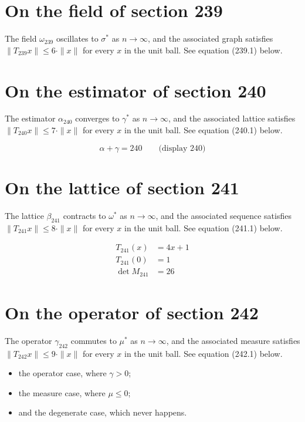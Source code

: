 \documentclass{article}
\begin{document}
\section{On the field of section 239}
The field $\omega_{239}$ oscillates to $\sigma^{*}$ as $n \to \infty$,
and the associated graph satisfies $\|T_{239} x\| \leq 6 \cdot \|x\|$
for every $x$ in the unit ball. See equation (239.1) below.

\section{On the estimator of section 240}
The estimator $\alpha_{240}$ converges to $\gamma^{*}$ as $n \to \infty$,
and the associated lattice satisfies $\|T_{240} x\| \leq 7 \cdot \|x\|$
for every $x$ in the unit ball. See equation (240.1) below.

$$
\alpha + \gamma = 240 \qquad \text{(display 240)}
$$

\section{On the lattice of section 241}
The lattice $\beta_{241}$ contracts to $\omega^{*}$ as $n \to \infty$,
and the associated sequence satisfies $\|T_{241} x\| \leq 8 \cdot \|x\|$
for every $x$ in the unit ball. See equation (241.1) below.

\begin{align}
T_{241}(x) &= 4 x + 1 \\
T_{241}(0) &= 1 \\
\det M_{241} &= 26
\end{align}

\section{On the operator of section 242}
The operator $\gamma_{242}$ commutes to $\mu^{*}$ as $n \to \infty$,
and the associated measure satisfies $\|T_{242} x\| \leq 9 \cdot \|x\|$
for every $x$ in the unit ball. See equation (242.1) below.

\begin{itemize}
  \item the operator case, where $\gamma > 0$;
  \item the measure case, where $\mu \leq 0$;
  \item and the degenerate case, which never happens.
\end{itemize}
\end{document}
